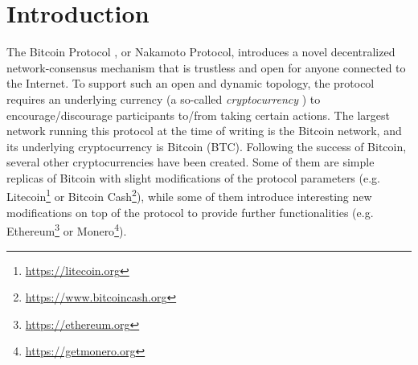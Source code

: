 
\section{Introduction}

The Bitcoin Protocol \cite{Bitcoin,DBLP:books/daglib/0040621,NC17}, or Nakamoto Protocol, introduces a novel decentralized network-consensus mechanism that is trustless and open for anyone connected to the Internet. To support such an open and dynamic topology, the protocol requires an underlying currency (a so-called \emph{cryptocurrency} \cite{NC17}) to encourage/discourage participants to/from taking certain actions. The largest network running this protocol at the time of writing is the Bitcoin network, and its underlying cryptocurrency is Bitcoin (BTC). Following the success of Bitcoin, several other cryptocurrencies have been created. Some of them are simple replicas of Bitcoin with slight modifications of the protocol parameters (e.g. Litecoin\footnote{\url{https://litecoin.org}}
or Bitcoin Cash\footnote{\url{https://www.bitcoincash.org}}),
while some of them introduce interesting new modifications on top of the protocol to provide further functionalities (e.g. Ethereum\footnote{\url{https://ethereum.org}}
or Monero\footnote{\url{https://getmonero.org}}).

